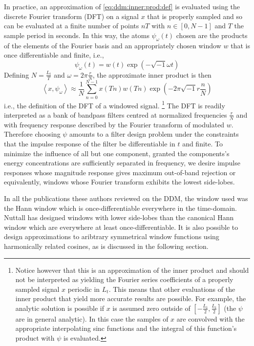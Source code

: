 \documentclass[twoside,a4paper]{article}
\begin{document}
In practice, an approximation of \ref{eq:ddm:inner:prod:def} is evaluated using
the discrete Fourier transform (DFT) on a signal $x$ that is properly sampled
and so can be evaluated at a finite number of points $nT$ with $n \in [0,N-1]$ and
$T$ the sample period in seconds. In this way, the atoms $\psi_{\omega}(t)$ chosen
are the products of the elements of the Fourier basis and an appropriately
chosen window $w$ that is once differentiable and finite, i.e.,
%
\[
    \psi_{\omega}(t) = w(t) \exp(-\sqrt{-1} \omega t)
\]
%
Defining $N = \frac{L_{t}}{T}$ and $\omega = 2
\pi \frac{r}{N}$, the approximate
inner product is then
%
\[
    \left\langle x , \psi_{\omega} \right\rangle \approx 
    \frac{1}{N} \sum_{n=0}^{N-1} x(Tn) w(Tn) \exp(-2 \pi \sqrt{-1} r \frac{n}{N}) 
\]
%
i.e., the definition of the DFT of a windowed signal.
\footnote{%
    Notice however that this is an approximation of the inner product and should
    not be interpreted as yielding the Fourier series coefficients of a properly
    sampled signal $x$ periodic in $L_{t}$. This means that other
    evaluations of the inner product that yield more accurate results are
    possible. For example, the analytic solution is possible if $x$ is assumed
    zero outside of $[-\frac{L_{t}}{2},\frac{L_{t}}{2}]$ (the $\psi$ are in
    general analytic).  In this case the samples of $x$ are convolved with the
    appropriate interpolating sinc functions and the integral of this function's
    product with $\psi$ is evaluated.
}%
The DFT is readily interpreted as a bank of bandpass filters centred at
normalized frequencies $\frac{r}{N}$ and with frequency response described by
the Fourier transform of modulated $w$. Therefore choosing $\psi$ amounts to a
filter design problem under the constraints that the impulse response of the
filter be differentiable in $t$ and finite. To minimize the influence of
all but one component, granted the components's energy concentrations are
sufficiently separated in frequency, we desire impulse responses whose magnitude
response gives maximum
out-of-band rejection or equivalently, windows whose Fourier transform exhibits
the lowest side-lobes.

In all the publications these authors reviewed on the DDM, the window used was
the Hann window which is once-differentiable everywhere in the time-domain.
Nuttall has designed windows with lower side-lobes than the canonical Hann
window which are everywhere at least once-differentiable. It is also possible to
design approximations to aribtrary symmetrical window functions using
harmonically related cosines, as is discussed in the following section.
\end{document}
